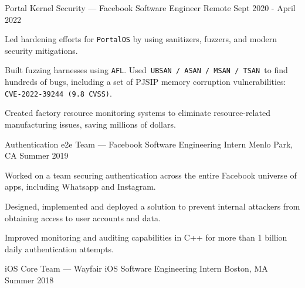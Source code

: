 \begin{cventries}
\cventry
{Portal Kernel Security — Facebook} %
{Software Engineer} %
{Remote} %
{Sept 2020 - April 2022} %
{
	\begin{cvitems} %
		\item {Led hardening efforts for \texttt{PortalOS} by using sanitizers, fuzzers, and modern security mitigations.} 
		\item {Built fuzzing harnesses using \texttt{AFL}. Used\texttt{ UBSAN / ASAN / MSAN / TSAN }to find hundreds of bugs, including a set of PJSIP memory corruption vulnerabilities: \texttt{CVE-2022-39244 (9.8 CVSS)}.}
		\item {Created factory resource monitoring systems to eliminate resource-related manufacturing issues, saving millions of dollars.}
	\end{cvitems}
}
\cventry
{Authentication e2e Team — Facebook} %
{Software Engineering Intern} %
{Menlo Park, CA} %
{Summer 2019} %
{
	\begin{cvitems} %
		\item {Worked on a team securing authentication across the entire Facebook universe of apps, including Whatsapp and Instagram.}
		\item {Designed, implemented and deployed a solution to prevent internal attackers from obtaining access to user accounts and data.}
		\item {Improved monitoring and auditing capabilities in C++ for more than 1 billion daily authentication attempts.}
	\end{cvitems}
}
\cventry
{\textnormal{i}OS Core Team — Wayfair} %
{iOS Software Engineering Intern} %
{Boston, MA} %
{Summer 2018} %
{
	\begin{cvitems} %

\end{cvitems}}
\end{cventries}

